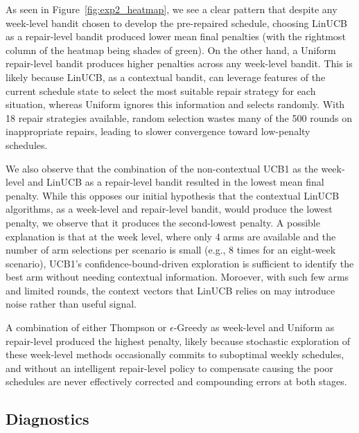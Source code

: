 \documentclass[11pt]{article}
\begin{document}
As seen in Figure~\ref{fig:exp2_heatmap}, we see a clear pattern that despite any week-level bandit chosen to develop the pre-repaired schedule, choosing LinUCB as a repair-level bandit produced lower mean final penalties (with the rightmost column of the heatmap being shades of green). On the other hand, a Uniform repair-level bandit produces higher penalties across any week-level bandit. This is likely because LinUCB, as a contextual bandit, can leverage features of the current schedule state to select the most suitable repair strategy for each situation, whereas Uniform ignores this information and selects randomly. With 18 repair strategies available, random selection wastes many of the 500 rounds on inappropriate repairs, leading to slower convergence toward low-penalty schedules.

We also observe that the combination of the non-contextual UCB1 as the week-level and LinUCB as a repair-level bandit resulted in the lowest mean final penalty. While this opposes our initial hypothesis that the contextual LinUCB algorithms, as a week-level and repair-level bandit, would produce the lowest penalty, we observe that it produces the second-lowest penalty. A possible explanation is that at the week level, where only 4 arms are available and the number of arm selections per scenario is small (e.g., 8 times for an eight-week scenario), UCB1's confidence-bound-driven exploration is sufficient to identify the best arm without needing contextual information. Moroever, with such few arms and limited rounds, the context vectors that LinUCB relies on may introduce noise rather than useful signal.

A combination of either Thompson or $\epsilon$-Greedy as week-level and Uniform as repair-level produced the highest penalty, likely because stochastic exploration of these week-level methods occasionally commits to suboptimal weekly schedules, and without an intelligent repair-level policy to compensate causing the poor schedules are never effectively corrected and compounding errors at both stages.



\subsection{Diagnostics}

\end{document}
